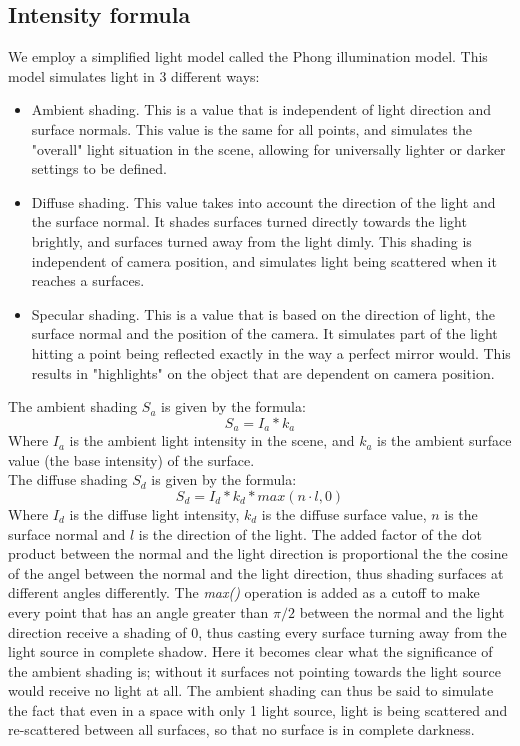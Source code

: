 \subsection{Intensity formula}

We employ a simplified light model called the Phong illumination model. This model simulates light in 3 different ways:
\begin{itemize}
	\item Ambient shading. This is a value that is independent of light direction and surface normals. This value is the same for all points, and simulates the "overall" light situation in the scene, allowing for universally lighter or darker settings to be defined.
	\item Diffuse shading. This value takes into account the direction of the light and the surface normal. It shades surfaces turned directly towards the light brightly, and surfaces turned away from the light dimly. This shading is independent of camera position, and simulates light being scattered when it reaches a surfaces.
	\item Specular shading. This is a value that is based on the direction of light, the surface normal and the position of the camera. It simulates part of the light hitting a point being reflected exactly in the way a perfect mirror would. This results in "highlights" on the object that are dependent on camera position.
\end{itemize}
The ambient shading $S_a$ is given by the formula:
\begin{equation}
	S_a = I_a * k_a
\end{equation}
Where $I_a$ is the ambient light intensity in the scene, and $k_a$ is the ambient surface value (the base intensity) of the surface. \\
The diffuse shading $S_d$ is given by the formula:
\begin{equation}
	S_d = I_d * k_d * max(n \cdot l, 0)
\end{equation}
Where $I_d$ is the diffuse light intensity, $k_d$ is the diffuse surface value, $n$ is the surface normal and $l$ is the direction of the light. The added factor of the dot product between the normal and the light direction is proportional the the cosine of the angel between the normal and the light direction, thus shading surfaces at different angles differently. The \textsl{max()} operation is added as a cutoff to make every point that has an angle greater than $\pi/2$ between the normal and the light direction receive a shading of 0, thus casting every surface turning away from the light source in complete shadow. Here it becomes clear what the significance of the ambient shading is; without it surfaces not pointing towards the light source would receive no light at all. The ambient shading can thus be said to simulate the fact that even in a space with only 1 light source, light is being scattered and re-scattered between all surfaces, so that no surface is in complete darkness.\\
